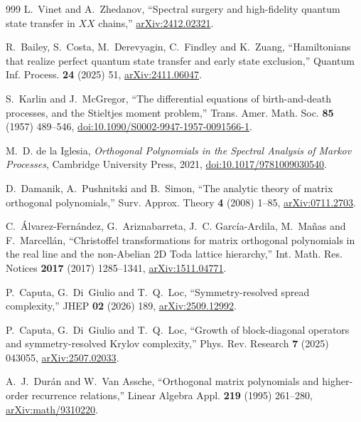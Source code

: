 \documentclass[a4paper,11pt]{article}
\theoremstyle{definition}
\theoremstyle{remark}
\begin{document}
\begin{thebibliography}{999}
L.~Vinet and A.~Zhedanov,
``Spectral surgery and high-fidelity quantum state transfer in $XX$ chains,''
\href{https://arxiv.org/abs/2412.02321}{arXiv:2412.02321}.

R.~Bailey, S.~Costa, M.~Derevyagin, C.~Findley and K.~Zuang,
``Hamiltonians that realize perfect quantum state transfer and early state exclusion,'' Quantum Inf. Process. \textbf{24} (2025) 51,
\href{https://arxiv.org/abs/2411.06047}{arXiv:2411.06047}.

S.~Karlin and J.~McGregor, ``The differential equations of birth-and-death processes, and the Stieltjes moment problem,'' Trans. Amer. Math. Soc. \textbf{85} (1957) 489--546,
\href{https://doi.org/10.1090/S0002-9947-1957-0091566-1}{doi:10.1090/S0002-9947-1957-0091566-1}.

M.~D. de la Iglesia, \emph{Orthogonal Polynomials in the Spectral Analysis of Markov Processes}, Cambridge University Press, 2021,
\href{https://doi.org/10.1017/9781009030540}{doi:10.1017/9781009030540}.

D.~Damanik, A.~Pushnitski and B.~Simon, ``The analytic theory of matrix orthogonal polynomials,'' Surv. Approx. Theory \textbf{4} (2008) 1--85, \href{https://arxiv.org/abs/0711.2703}{arXiv:0711.2703}.

C.~\'Alvarez-Fern\'andez, G.~Ariznabarreta, J.~C. Garc\'ia-Ardila, M.~Ma\~nas and F.~Marcell\'an, ``Christoffel transformations for matrix orthogonal polynomials in the real line and the non-Abelian 2D Toda lattice hierarchy,'' Int. Math. Res. Notices \textbf{2017} (2017) 1285--1341, \href{https://arxiv.org/abs/1511.04771}{arXiv:1511.04771}.

P.~Caputa, G.~Di~Giulio and T.~Q.~Loc,
``Symmetry-resolved spread complexity,''
JHEP \textbf{02} (2026) 189,
\href{https://arxiv.org/abs/2509.12992}{arXiv:2509.12992}.

P.~Caputa, G.~Di~Giulio and T.~Q.~Loc,
``Growth of block-diagonal operators and symmetry-resolved Krylov complexity,''
Phys. Rev. Research \textbf{7} (2025) 043055,
\href{https://arxiv.org/abs/2507.02033}{arXiv:2507.02033}.

A.~J.~Dur\'an and W.~Van Assche,
``Orthogonal matrix polynomials and higher-order recurrence relations,''
Linear Algebra Appl. \textbf{219} (1995) 261--280,
\href{https://arxiv.org/abs/math/9310220}{arXiv:math/9310220}.


\end{thebibliography}
\end{document}
